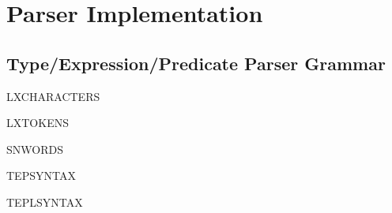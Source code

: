 \section{Parser Implementation}

\subsection{Type/Expression/Predicate Parser Grammar}

LXCHARACTERS \LXCHARACTERS

LXTOKENS \LXTOKENS

SNWORDS \SNWORDS

TEPSYNTAX \TEPSYNTAX

TEPLSYNTAX \TEPLSYNTAX
